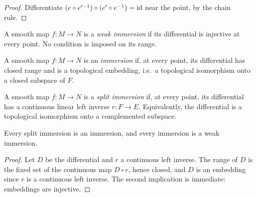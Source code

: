 \begin{proof}
  \leanok
  Differentiate $(e \circ e'^{-1}) \circ (e' \circ e^{-1}) = \mathrm{id}$ near the point, by the
  chain rule.
\end{proof}

\begin{definition}
  \label{def:weak-immersion}
  \leanok
  A smooth map $f \colon M \to N$ is a \emph{weak immersion} if its differential is injective
  at every point. No condition is imposed on its range.
\end{definition}

\begin{definition}[Immersion]
  \label{def:immersion}
  \leanok
  A smooth map $f \colon M \to N$ is an \emph{immersion} if, at every point, its differential
  has closed range and is a topological embedding, i.e.\ a topological isomorphism onto a
  closed subspace of $F$.
\end{definition}

\begin{definition}
  \label{def:split-immersion}
  \leanok
  A smooth map $f \colon M \to N$ is a \emph{split immersion} if, at every point, its
  differential has a continuous linear left inverse $r \colon F \to E$. Equivalently, the
  differential is a topological isomorphism onto a complemented subspace.
\end{definition}

\begin{proposition}
  \label{prop:sub-immersion-implications}
  \leanok
  Every split immersion is an immersion, and every immersion is a weak immersion.
\end{proposition}

\begin{proof}
  \leanok
  Let $D$ be the differential and $r$ a continuous left inverse. The range of $D$ is the fixed
  set of the continuous map $D \circ r$, hence closed, and $D$ is an embedding since $r$ is a
  continuous left inverse. The second implication is immediate: embeddings are injective.
\end{proof}

